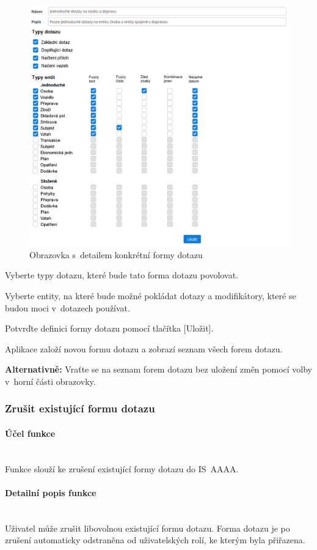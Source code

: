 \documentclass[thesis=M,czech]{FITthesis}[2019/12/23]
\newcommand{\lbparagraph}[1]{\paragraph{#1}\mbox{}\\} %
\newenvironment{reusefigure}[2][htbp]
  {\addtocounter{figure}{-1}%
   \renewcommand{\theHfigure}{dupe-fig}%
   \renewcommand{\thefigure}{\ref{#2}}%
   \renewcommand{\addcontentsline}[3]{}%
   \begin{figure}[#1]}
  {\end{figure}} %
\begin{document}
\begin{reusefigure}[H]{fig:Obrazovka s~detailem konkrétní formy dotazu}
  \includegraphics[width=\textwidth]{res/guide/QueryFormDetail.png}
  \caption{Obrazovka s~detailem konkrétní formy dotazu}
\end{reusefigure}

Vyberte typy dotazu, které bude tato forma dotazu povolovat.

Vyberte entity, na které bude možné pokládat dotazy a modifikátory, které se budou moci v~dotazech používat.

Potvrďte definici formy dotazu pomocí tlačítka [Uložit].

Aplikace založí novou formu dotazu a zobrazí seznam všech forem dotazu.

\textbf{Alternativně:} Vraťte se na seznam forem dotazu bez uložení změn pomocí volby  v~horní části obrazovky.

\newpage
\subsubsection{Zrušit existující formu dotazu}
\lbparagraph{Účel funkce}
Funkce slouží ke zrušení existující formy dotazu do IS~AAAA.

\lbparagraph{Detailní popis funkce}
Uživatel může zrušit libovolnou existující formu dotazu. Forma dotazu je po zrušení automaticky odstraněna od uživatelských rolí, ke kterým byla přiřazena.
\end{document}

